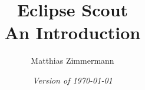 
\author{Matthias Zimmermann}
\title{
\Huge\bf Eclipse Scout\\
\huge An Introduction
}
\ifpdf
  \isodate
\fi
\date{\emph{Version of \today}}
\maketitle

